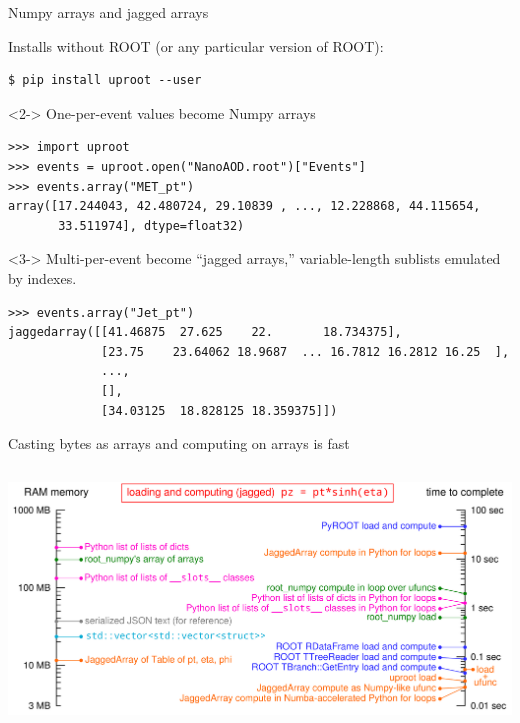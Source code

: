 \documentclass[aspectratio=169]{beamer}
\begin{document}
\begin{frame}[fragile]{Numpy arrays and jagged arrays}
\normalsize
\vspace{0.35 cm}

Installs without ROOT (or any particular version of ROOT):

\small
\begin{verbatim}
$ pip install uproot --user
\end{verbatim}
\normalsize

\begin{uncoverenv}<2->
One-per-event values become Numpy arrays

\small
\begin{verbatim}
>>> import uproot
>>> events = uproot.open("NanoAOD.root")["Events"]
>>> events.array("MET_pt")
array([17.244043, 42.480724, 29.10839 , ..., 12.228868, 44.115654,
       33.511974], dtype=float32)
\end{verbatim}
\end{uncoverenv}
\normalsize

\begin{uncoverenv}<3->
Multi-per-event become ``jagged arrays,'' variable-length sublists emulated by indexes.

\small
\begin{verbatim}
>>> events.array("Jet_pt")
jaggedarray([[41.46875  27.625    22.       18.734375],
             [23.75    23.64062 18.9687  ... 16.7812 16.2812 16.25  ],
             ...,
             [],
             [34.03125  18.828125 18.359375]])
\end{verbatim}
\end{uncoverenv}
\end{frame}

\begin{frame}{Casting bytes as arrays and computing on arrays is fast}
\vspace{0.3 cm}
\begin{columns}
\includegraphics[width=\linewidth]{logscales.pdf}
\end{columns}
\end{frame}
\end{document}
